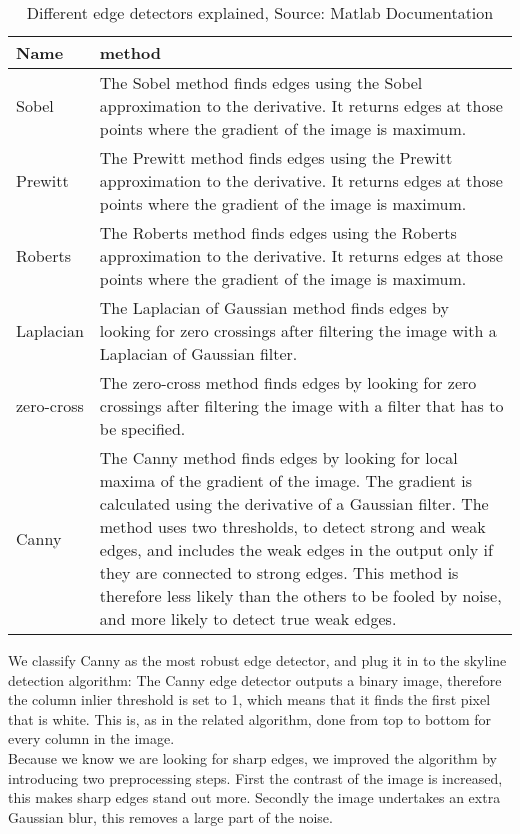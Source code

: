 \begin{table}[ht]
\caption{Different edge detectors explained, Source: Matlab Documentation}
\label{tab:edge}
\begin{tabular}{|l|p{8cm}|}
	\hline
	Name & method\\
	\hline
	\hline
	Sobel					& The Sobel method finds edges using the Sobel
	approximation to the derivative. It returns edges at those points where the
	gradient of the image is maximum.\\
	\hline
	Prewitt					& The Prewitt method finds edges using the Prewitt
	approximation to the derivative. It returns edges at those points where the
	gradient of the image is maximum.\\
	\hline
	Roberts					& The Roberts method finds edges using the Roberts
	approximation to the derivative. It returns edges at those points where the
	gradient of the image is maximum.\\
	\hline
	Laplacian				& The Laplacian of Gaussian method finds edges by
	looking for zero crossings after filtering the image with a Laplacian of Gaussian
	filter.\\
	\hline
	zero-cross				& The zero-cross method finds edges by looking for zero
	crossings after filtering the image with a filter that has to be specified.\\
	\hline
	Canny					& The Canny method finds edges by looking for local
	maxima of the gradient of the image. The gradient is calculated using the derivative of
	a Gaussian filter. The method uses two thresholds, to detect strong and weak
	edges, and includes the weak edges in the output only if they are connected to
	strong edges. This method is therefore less likely than the others to be fooled
	by noise, and more likely to detect true weak edges.\\
	\hline
\end{tabular}
\end{table}
\clearpage
We classify Canny as the most robust edge detector, and plug it in to the skyline detection
algorithm: 
The Canny edge detector outputs a binary image, therefore the column inlier
threshold is set to 1, which means that it finds the first pixel that is white. 
This is, as in the related algorithm, done from top to bottom for every column in
the image.\\
Because we know we are looking for sharp edges, we improved the algorithm by
introducing two preprocessing steps. First the contrast of the image is
increased, this makes sharp edges stand out more.  Secondly the image undertakes
an extra Gaussian blur, this removes a large part of the noise. 

